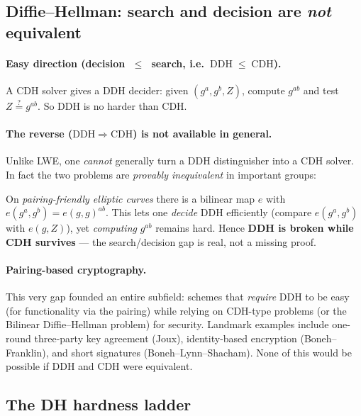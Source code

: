 \documentclass[11pt]{article}
\theoremstyle{definition}
\theoremstyle{plain}
\theoremstyle{remark}
\newcommand{\cdh}{\mathrm{CDH}}
\newcommand{\ddh}{\mathrm{DDH}}
\newcommand{\reduces}{\;\leq\;}
\begin{document}
\subsection{Diffie--Hellman: search and decision are \emph{not} equivalent}

\paragraph{Easy direction (decision \texorpdfstring{$\reduces$}{<=} search, i.e.\ $\ddh\reduces\cdh$).}
A $\cdh$ solver gives a $\ddh$ decider: given $(g^a,g^b,Z)$, compute $g^{ab}$ and test
$Z\overset{?}{=}g^{ab}$. So $\ddh$ is no harder than $\cdh$.

\paragraph{The reverse ($\ddh\Longrightarrow\cdh$) is not available in general.}
Unlike LWE, one \emph{cannot} generally turn a $\ddh$ distinguisher into a $\cdh$ solver.
In fact the two problems are \emph{provably inequivalent} in important groups:

\begin{keybox}
On \emph{pairing-friendly elliptic curves} there is a bilinear map $e$ with
$e(g^a,g^b)=e(g,g)^{ab}$. This lets one \emph{decide} DDH efficiently
(compare $e(g^a,g^b)$ with $e(g,Z)$), yet \emph{computing} $g^{ab}$ remains hard.
Hence \textbf{DDH is broken while CDH survives} --- the search/decision gap is real,
not a missing proof.
\end{keybox}

\paragraph{Pairing-based cryptography.}
This very gap founded an entire subfield: schemes that \emph{require} DDH to be easy (for
functionality via the pairing) while relying on CDH-type problems (or the Bilinear
Diffie--Hellman problem) for security. Landmark examples include one-round three-party key
agreement (Joux), identity-based encryption (Boneh--Franklin), and short signatures
(Boneh--Lynn--Shacham). None of this would be possible if DDH and CDH were equivalent.

\subsection{The DH hardness ladder}
\end{document}

